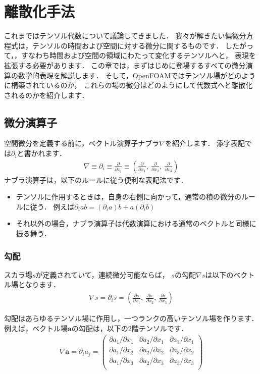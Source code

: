 \chapter{離散化手法}
\label{chap:2}
これまではテンソル代数について議論してきました．
我々が解きたい偏微分方程式は，テンソルの時間および空間に対する微分に関するものです．
したがって，，すなわち時間および空間の領域にわたって変化するテンソルへと，
表現を拡張する必要があります．
この章では，まずはじめに登場するすべての微分演算の数学的表現を解説します．
そして，OpenFOAMではテンソル場がどのように構築されているのか，
これらの場の微分はどのようにして代数式へと離散化されるのかを紹介します．



\section{微分演算子}
\label{sec:2.1}
空間微分を定義する前に，ベクトル演算子ナブラ$\nabla$を紹介します．
添字表記では$\partial_{i}$と書かれます．
\begin{align}
 \label{eq:2.1}
 \nabla \equiv \partial_{i} \equiv \frac{\partial}{\partial x_{i}}
 \equiv \left(\frac{\partial}{\partial x_{1}},\
 \frac{\partial}{\partial x_{2}},\
 \frac{\partial}{\partial x_{3}}\right)
\end{align}
ナブラ演算子は，以下のルールに従う便利な表記法です．
\begin{itemize}
 \item テンソルに作用するときは，自身の右側に向かって，通常の積の微分のルールに従う．
       例えば$\partial_{i}ab = (\partial_{i}a)b + a(\partial_{i}b)$
 \item それ以外の場合，ナブラ演算子は代数演算における通常のベクトルと同様に振る舞う．
\end{itemize}


\subsection{勾配}
\label{ssec:2.1.1}
スカラ場$s$が定義されていて，連続微分可能ならば，
$s$の勾配$\nabla s$は以下のベクトル場となります．
\begin{align}
 \label{eq:2.2}
 \nabla s = \partial_{i}s
 = \left(\frac{\partial s}{\partial x_{1}},\
 \frac{\partial s}{\partial x_{2}},\
 \frac{\partial s}{\partial x_{3}}\right)
\end{align}

勾配はあらゆるテンソル場に作用し，一つランクの高いテンソル場を作ります．
例えば，ベクトル場$\bm{a}$の勾配は，以下の2階テンソルです．
\begin{align}
 \label{eq:2.3}
 \nabla\bm{a} = \partial_{i}a_{j} =
 \begin{pmatrix}
  \partial a_{1}/\partial x_{1} & \partial a_{2}/\partial x_{1} & \partial a_{3}/\partial x_{1} \\
  \partial a_{1}/\partial x_{2} & \partial a_{2}/\partial x_{2} & \partial a_{3}/\partial x_{2} \\
  \partial a_{1}/\partial x_{3} & \partial a_{2}/\partial x_{3} & \partial a_{3}/\partial x_{3} \\
 \end{pmatrix}
\end{align}


